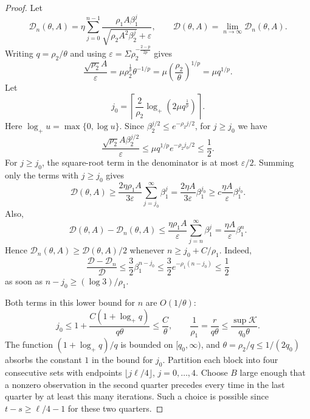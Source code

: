 \documentclass[11pt,letterpaper]{article}
\theoremstyle{definition}
\newcommand{\eps}{\varepsilon}
\begin{document}
\begin{proof}
Let
\[
\mathcal D_n(\theta,A)=\eta\sum_{j=0}^{n-1}
\frac{\rho_1A\beta_1^j}
{\sqrt{\rho_2A^2\beta_2^j}+\eps},
\qquad
\mathcal D(\theta,A)=\lim_{n\to\infty}\mathcal D_n(\theta,A).
\]
Writing $q=\rho_2/\theta$ and using
$\eps=\Sigma\rho_2^{-\frac{2-p}{2p}}$ gives
\begin{equation}
\frac{\sqrt{\rho_2}A}{\eps}
=\mu\rho_2^{\frac{1}{p}}\theta^{-1/p}
=\mu\left(\frac{\rho_2}{\theta}\right)^{1/p}
=\mu q^{1/p}.
\label{eq:displacement-scale-ratio}
\end{equation}
Let
\[
j_0=\left\lceil\frac{2}{\rho_2}
\log_+\left(2\mu q^{\frac{1}{p}}\right)\right\rceil.
\]
Here $\log_+u=\max\{0,\log u\}$. Since
$\beta_2^{j/2}\le e^{-\rho_2j/2}$, for $j\ge j_0$ we have
\[
\frac{\sqrt{\rho_2}A\beta_2^{j/2}}{\eps}
\le\mu q^{1/p}e^{-\rho_2j_0/2}\le\frac12.
\]
For $j\ge j_0$, the square-root term in the denominator is at most
$\eps/2$. Summing only the terms with $j\ge j_0$ gives
\begin{equation}
\mathcal D(\theta,A)
\ge\frac{2\eta\rho_1A}{3\eps}\sum_{j=j_0}^\infty\beta_1^j
=\frac{2\eta A}{3\eps}\beta_1^{j_0}
\ge c\frac{\eta A}{\eps}\beta_1^{j_0}.
\label{eq:displacement-lower-tail}
\end{equation}
Also,
\begin{equation}
\mathcal D(\theta,A)-\mathcal D_n(\theta,A)
\le\frac{\eta\rho_1A}{\eps}\sum_{j=n}^\infty\beta_1^j
=\frac{\eta A}{\eps}\beta_1^n.
\label{eq:displacement-upper-tail}
\end{equation}
Hence $\mathcal D_n(\theta,A)\ge\mathcal D(\theta,A)/2$ whenever
$n\ge j_0+C/\rho_1$. Indeed,
\[
\frac{\mathcal D-\mathcal D_n}{\mathcal D}
\le\frac32\beta_1^{n-j_0}
\le\frac32e^{-\rho_1(n-j_0)}\le\frac12
\]
as soon as $n-j_0\ge(\log3)/\rho_1$.

Both terms in this lower bound for $n$ are $O(1/\theta)$:
\[
j_0\le1+\frac{C(1+\log_+q)}{q\theta}
\le\frac{C}{\theta},
\qquad
\frac1{\rho_1}=\frac{r}{q\theta}
\le\frac{\sup\mathcal K}{q_0\theta}.
\]
The function $(1+\log_+q)/q$ is bounded on $[q_0,\infty)$,
and $\theta=\rho_2/q\le1/(2q_0)$ absorbs the constant $1$ in the bound
for $j_0$. Partition each block into four consecutive sets with endpoints
$\lfloor j\ell/4\rfloor$, $j=0,\ldots,4$.
Choose $B$ large enough that a nonzero observation in the second quarter
precedes every time in the last quarter by at least this many iterations.
Such a choice is possible since $t-s\ge\ell/4-1$ for these two quarters.


\end{proof}
\end{document}
